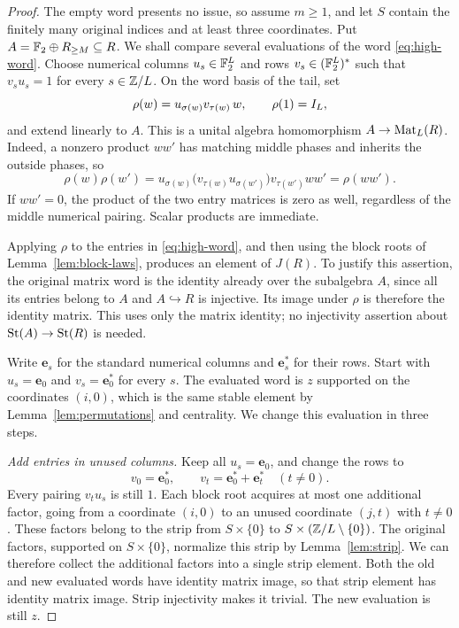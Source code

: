 \begin{proof}
The empty word presents no issue, so assume $m\ge1$, and let $S$
contain the finitely many original indices and at least three
coordinates. Put
$A=\mathbb F_2\oplus R_{\ge M}\subseteq R$.
We shall compare several evaluations of the word
\eqref{eq:high-word}. Choose numerical columns
$u_s\in\mathbb F_2^L$ and rows $v_s\in(\mathbb F_2^L)^*$ such that
$v_su_s=1$ for every $s\in\mathbb Z/L$. On the word basis of the tail,
set
\begin{equation}\label{eq:phase-rank-one}
 \rho(w)=u_{\sigma(w)}v_{\tau(w)}\,w,
 \qquad \rho(1)=I_L,
\end{equation}
and extend linearly to $A$.
This is a unital algebra homomorphism $A\to\operatorname{Mat}_L(R)$.
Indeed, a nonzero product $ww'$ has matching middle phases and
inherits the outside phases, so
\[
 \rho(w)\rho(w')
 =u_{\sigma(w)}
   \bigl(v_{\tau(w)}u_{\sigma(w')}\bigr)
   v_{\tau(w')}ww'
 =\rho(ww').
\]
If $ww'=0$, the product of the two entry matrices is zero as well,
regardless of the middle numerical pairing. Scalar products are
immediate.

Applying $\rho$ to the entries in \eqref{eq:high-word}, and then
using the block roots of Lemma~\ref{lem:block-laws}, produces an
element of $J(R)$. To justify this assertion, the original matrix
word is the identity already over the subalgebra $A$, since all its
entries belong to $A$ and $A\hookrightarrow R$ is injective. Its
image under $\rho$ is therefore the identity matrix. This uses only
the matrix identity; no injectivity assertion about
$\operatorname{St}(A)\to\operatorname{St}(R)$ is needed.

Write $\mathbf e_s$ for the standard numerical columns and
$\mathbf e_s^*$ for their rows. Start with
$u_s=\mathbf e_0$ and $v_s=\mathbf e_0^*$ for every $s$.
The evaluated word is $z$ supported on the coordinates $(i,0)$,
which is the same stable element by
Lemma~\ref{lem:permutations} and centrality. We change this
evaluation in three steps.

\emph{Add entries in unused columns.}
Keep all $u_s=\mathbf e_0$, and change the rows to
\[
 v_0=\mathbf e_0^*,\qquad
 v_t=\mathbf e_0^*+\mathbf e_t^*\quad(t\ne0).
\]
Every pairing $v_tu_s$ is still $1$.
Each block root acquires at most one additional factor, going
from a coordinate $(i,0)$ to an unused coordinate $(j,t)$ with
$t\ne0$. These factors belong to the strip from
$S\times\{0\}$ to $S\times(\mathbb Z/L\setminus\{0\})$.
The original factors, supported on $S\times\{0\}$, normalize this
strip by Lemma~\ref{lem:strip}. We can therefore collect the
additional factors into a single strip element. Both the old and
new evaluated words have identity matrix image, so that strip
element has identity matrix image. Strip injectivity makes it
trivial. The new evaluation is still $z$.


\end{proof}
